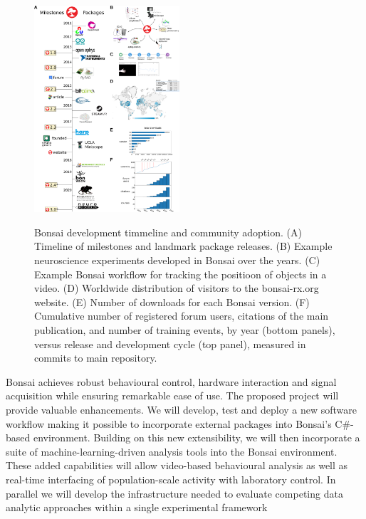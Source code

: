 \setlength{\columnsep}{1em}
\begin{figure}
    \href{http://www.gatsby.ucl.ac.uk/~rapela/bbsrc-bbr21/roadmap-bbsrc_noCaption.png}{\includegraphics[width=0.48\textwidth]{figures/roadmap-bbsrc_noCaption.png}}

  \caption{Bonsai development timmeline and community adoption. (A) Timeline of
    milestones and landmark package releases. (B) Example neuroscience
    experiments developed in Bonsai over the years. (C) Example Bonsai workflow
    for tracking the positioon of objects in a video. (D) Worldwide
    distribution of visitors to the bonsai-rx.org website. (E)
    Number of downloads for each Bonsai version. (F) Cumulative number of
    registered forum users, citations of the main publication, and number of
    training events, by year (bottom panels), versus release and development
    cycle (top panel), measured in commits to main repository.}

  \label{fig:bonsai}

\end{figure}



Bonsai achieves robust behavioural control, hardware interaction and signal acquisition while ensuring remarkable ease of use.  The proposed project will provide valuable enhancements.  We will develop, test and deploy a new software workflow making it possible to incorporate external packages into Bonsai's C\#-based environment.  Building on this new extensibility, we will then incorporate a suite of machine-learning-driven analysis tools into the Bonsai environment.  These added capabilities will allow  video-based behavioural analysis as well as real-time interfacing of population-scale activity with laboratory control.  In parallel we will develop the infrastructure needed to evaluate competing data analytic approaches within a single experimental framework

